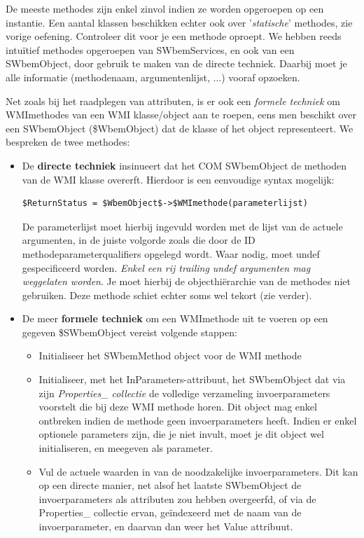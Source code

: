 \documentclass[11pt,a4paper]{report}
\begin{document}
De meeste methodes zijn enkel zinvol indien ze worden opgeroepen op een instantie. Een aantal klassen beschikken echter ook over '\textit{statische}' methodes, zie vorige oefening. Controleer dit voor je een methode oproept.
We hebben reeds intuïtief methodes opgeroepen van SWbemServices, en ook van een SWbemObject, door gebruik te maken van de directe techniek. Daarbij moet je alle informatie (methodenaam, argumentenlijst, ...) vooraf opzoeken.
\par Net zoals bij het raadplegen van attributen, is er ook een \textit{formele techniek} om WMImethodes van een WMI klasse/object aan te roepen, eens men beschikt over een SWbemObject (\$WbemObject) dat de klasse of het object representeert. We bespreken de twee methodes:
\begin{itemize}
	\item De \textbf{directe techniek} insinueert dat het COM SWbemObject de methoden van de WMI klasse overerft. Hierdoor is een eenvoudige syntax mogelijk:
	\begin{lstlisting}
$ReturnStatus = $WbemObject$->$WMImethode(parameterlijst)
	\end{lstlisting}
	De parameterlijst moet hierbij ingevuld worden met de lijst van de actuele argumenten, in de juiste volgorde zoals die door de ID methodeparameterqualifiers opgelegd wordt. Waar nodig, moet undef gespecificeerd worden. \textit{Enkel een rij trailing undef argumenten mag weggelaten worden}. Je moet hierbij de objecthiërarchie van de methodes niet gebruiken. Deze methode schiet echter soms wel tekort (zie verder).
	\item De meer \textbf{formele techniek} om een WMImethode uit te voeren op een gegeven \$SWbemObject vereist volgende stappen:
	\begin{itemize}
		\item Initialiseer het SWbemMethod object voor de WMI methode
		\item Initialiseer, met het InParameters-attribuut, het SWbemObject dat via zijn \textit{Properties\_ collectie} de volledige verzameling invoerparameters voorstelt die bij deze WMI methode horen. Dit object mag enkel ontbreken indien de methode geen invoerparameters heeft. Indien er enkel optionele parameters zijn, die je niet invult, moet je dit object wel initialiseren, en meegeven als parameter.
		\item Vul de actuele waarden in van de noodzakelijke invoerparameters. Dit kan op een directe manier, net alsof het laatste SWbemObject de invoerparameters als attributen zou hebben overgeerfd, of via de Properties\_ collectie ervan, geïndexeerd met de naam van de invoerparameter, en daarvan dan weer het Value attribuut.

\end{itemize}
\end{itemize}
\end{document}
